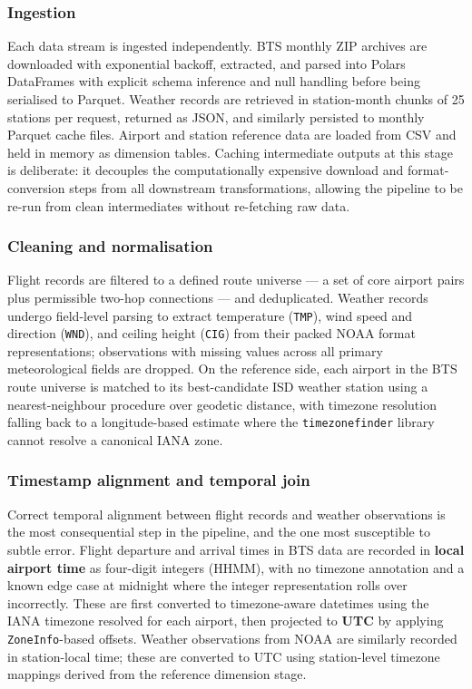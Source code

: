\documentclass[
  letterpaper,
  DIV=11,
  numbers=noendperiod]{scrartcl}
\begin{document}
\subsubsection{Ingestion}\label{ingestion}

Each data stream is ingested independently. BTS monthly ZIP archives are
downloaded with exponential backoff, extracted, and parsed into Polars
DataFrames with explicit schema inference and null handling before being
serialised to Parquet. Weather records are retrieved in station-month
chunks of 25 stations per request, returned as JSON, and similarly
persisted to monthly Parquet cache files. Airport and station reference
data are loaded from CSV and held in memory as dimension tables. Caching
intermediate outputs at this stage is deliberate: it decouples the
computationally expensive download and format-conversion steps from all
downstream transformations, allowing the pipeline to be re-run from
clean intermediates without re-fetching raw data.

\subsubsection{Cleaning and
normalisation}\label{cleaning-and-normalisation}

Flight records are filtered to a defined route universe --- a set of
core airport pairs plus permissible two-hop connections --- and
deduplicated. Weather records undergo field-level parsing to extract
temperature (\texttt{TMP}), wind speed and direction (\texttt{WND}), and
ceiling height (\texttt{CIG}) from their packed NOAA format
representations; observations with missing values across all primary
meteorological fields are dropped. On the reference side, each airport
in the BTS route universe is matched to its best-candidate ISD weather
station using a nearest-neighbour procedure over geodetic distance, with
timezone resolution falling back to a longitude-based estimate where the
\texttt{timezonefinder} library cannot resolve a canonical IANA zone.

\subsubsection{Timestamp alignment and temporal
join}\label{timestamp-alignment-and-temporal-join}

Correct temporal alignment between flight records and weather
observations is the most consequential step in the pipeline, and the one
most susceptible to subtle error. Flight departure and arrival times in
BTS data are recorded in \textbf{local airport time} as four-digit
integers (HHMM), with no timezone annotation and a known edge case at
midnight where the integer representation rolls over incorrectly. These
are first converted to timezone-aware datetimes using the IANA timezone
resolved for each airport, then projected to \textbf{UTC} by applying
\texttt{ZoneInfo}-based offsets. Weather observations from NOAA are
similarly recorded in station-local time; these are converted to UTC
using station-level timezone mappings derived from the reference
dimension stage.
\end{document}
